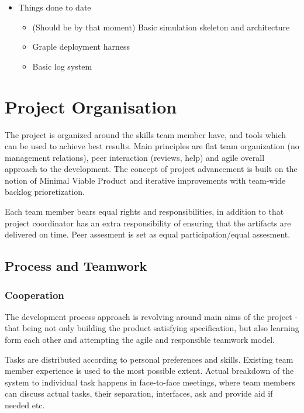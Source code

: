 \begin{itemize}
\begin{itemize}
	\end{itemize}

	\item Things done to date
	\begin{itemize}
		\item (Should be by that moment) Basic simulation skeleton and architecture
		\item Graple deployment harness
		\item Basic log system
	\end{itemize}

\end{itemize}


\section{Project Organisation} %
The project is organized around the skills team member have, and tools which can be used to achieve best results. Main
principles are flat team organization (no management relations), peer interaction (reviews, help) and agile overall
approach to the development. The concept of project advancement is built on the notion of Minimal Viable Product and
iterative improvements with team-wide backlog prioretization.

Each team member bears equal rights and responsibilities, in addition to that project coordinator has an extra responsibility
of ensuring that the artifacts are delivered on time. Peer assesment is set as equal participation/equal assesment.

\subsection{Process and Teamwork}
\subsubsection{Cooperation}
The development process approach is revolving around main aims of the project - that being not only building the product
satisfying specification, but also learning form each other and attempting the agile and responsible teamwork model.

Tasks are distributed according to personal preferences and skills. Existing team member experience is used to the most
possible extent. Actual breakdown of the system to individual task happens in face-to-face meetings, where team members
can discuss actual tasks, their separation, interfaces, ask and provide aid if needed etc.

